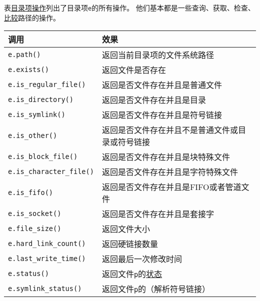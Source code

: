 表\hyperref[t20.22]{目录项操作}列出了目录项\texttt{e}的所有操作。
他们基本都是一些查询、获取、检查、
\hyperref[ch20.3.6]{比较}路径的操作。
\begin{table}[htb]
    \centering
    \begin{tabular}{l|l}
        \hline
        \textbf{调用}                      & \textbf{效果}                               \\
        \hline
        \texttt{e.path()}                & 返回当前目录项的文件系统路径                            \\
        \texttt{e.exists()}              & 返回文件是否存在                                  \\
        \texttt{e.is\_regular\_file()}   & 返回是否文件存在并且是普通文件                           \\
        \texttt{e.is\_directory()}       & 返回是否文件存在并且是目录                             \\
        \texttt{e.is\_symlink()}         & 返回是否文件存在并且是符号链接                           \\
        \texttt{e.is\_other()}           & 返回是否文件存在并且不是普通文件或目录或符号链接                  \\
        \texttt{e.is\_block\_file()}     & 返回是否文件存在并且是块特殊文件                          \\
        \texttt{e.is\_character\_file()} & 返回是否文件存在并且是字符特殊文件                         \\
        \texttt{e.is\_fifo()}            & 返回是否文件存在并且是FIFO或者管道文件                     \\
        \texttt{e.is\_socket()}          & 返回是否文件存在并且是套接字                            \\
        \texttt{e.file\_size()}          & 返回文件大小                                    \\
        \texttt{e.hard\_link\_count()}   & 返回硬链接数量                                   \\
        \texttt{e.last\_write\_time()}   & 返回最后一次修改时间                                \\
        \texttt{e.status()}              & 返回文件\texttt{p}的\hyperref[ch20.4.2]{状态}    \\
        \texttt{e.symlink\_status()}     & 返回文件\texttt{p}的\nameref{ch20.4.2}（解析符号链接） \\

\end{tabular}
\end{table}
